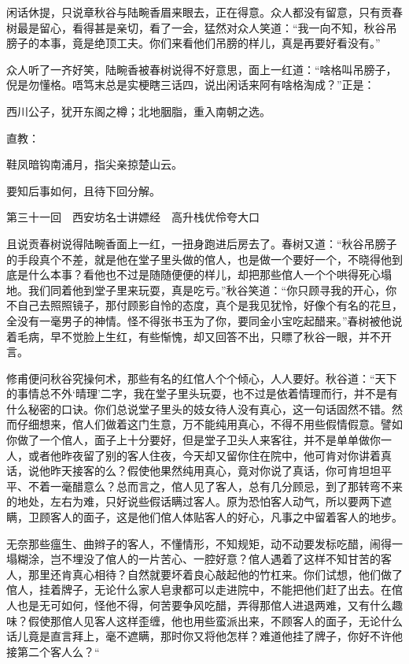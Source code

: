 \documentclass[12pt,UTF8]{ctexbook}
\begin{document}
{{{闲话休提，只说章秋谷与陆畹香眉来眼去，正在得意。众人都没有留意，只有贡春树最是留心，看得甚是亲切，看了一会，猛然对众人笑道：“我一向不知，秋谷吊膀子的本事，竟是绝顶工夫。你们来看他们吊膀的样儿，真是再要好看没有。”

众人听了一齐好笑，陆畹香被春树说得不好意思，面上一红道：“啥格叫吊膀子，倪是勿懂格。唔笃末总是实梗瞎三话四，说出闲话来阿有啥格淘成？”正是：

西川公子，犹开东阁之樽；北地胭脂，重入南朝之选。

直教：

鞋凤暗钩南浦月，指尖亲掠楚山云。

要知后事如何，且待下回分解。





第三十一回　西安坊名士讲嫖经　高升栈优伶夸大口





且说贡春树说得陆畹香面上一红，一扭身跑进后房去了。春树又道：“秋谷吊膀子的手段真个不差，就是他在堂子里头做的倌人，也是做一个要好一个，不晓得他到底是什么本事？看他也不过是随随便便的样儿，却把那些倌人一个个哄得死心塌地。我们同着他到堂子里来玩耍，真是吃亏。”秋谷笑道：“你只顾寻我的开心，你不自己去照照镜子，那付顾影自怜的态度，真个是我见犹怜，好像个有名的花旦，全没有一毫男子的神情。怪不得张书玉为了你，要同金小宝吃起醋来。”春树被他说着毛病，早不觉脸上生红，有些惭愧，却又回答不出，只瞟了秋谷一眼，并不开言。

修甫便问秋谷究操何术，那些有名的红倌人个个倾心，人人要好。秋谷道：“天下的事情总不外‘晴理’二字，我在堂子里头玩耍，也不过是依着情理而行，并不是有什么秘密的口诀。你们总说堂子里头的妓女待人没有真心，这一句话固然不错。然而仔细想来，倌人们做着这门生意，万不能纯用真心，不得不用些假情假意。譬如你做了一个倌人，面子上十分要好，但是堂子卫头人来客往，并不是单单做你一人，或者他昨夜留了别的客人住夜，今天却又留你住在院中，他可肯对你讲着真话，说他昨天接客的么？假使他果然纯用真心，竟对你说了真话，你可肯坦坦平平、不着一毫醋意么？总而言之，倌人见了客人，总有几分顾忌，到了那转弯不来的地处，左右为难，只好说些假话瞒过客人。原为恐怕客人动气，所以要两下遮瞒，卫顾客人的面子，这是他们倌人体贴客人的好心，凡事之中留着客人的地步。

无奈那些瘟生、曲辫子的客人，不懂情形，不知规矩，动不动要发标吃醋，闹得一塌糊涂，岂不埋没了倌人的一片苦心、一腔好意？倌人遇着了这样不知甘苦的客人，那里还肯真心相待？自然就要坏着良心敲起他的竹杠来。你们试想，他们做了倌人，挂着牌子，无论什么家人皂隶都可以走进院中，不能把他们赶了出去。在倌人也是无可如何，怪他不得，何苦要争风吃醋，弄得那倌人进退两难，又有什么趣味？假使那倌人见客人这样歪缠，他也用些蛮派出来，不顾客人的面子，无论什么话儿竟是直言拜上，毫不遮瞒，那时你又将他怎样？难道他挂了牌子，你好不许他接第二个客人么？“

}}}
\end{document}
